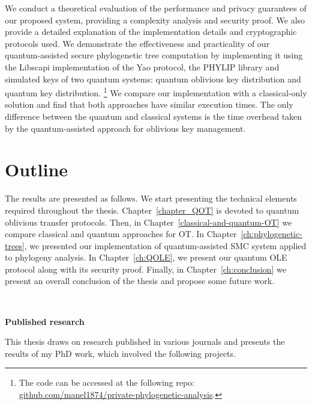 We conduct a theoretical evaluation of the performance and privacy guarantees of our proposed system, providing a complexity analysis and security proof. We also provide a detailed explanation of the implementation details and cryptographic protocols used. We demonstrate the effectiveness and practicality of our quantum-assisted secure phylogenetic tree computation by implementing it using the Libscapi implementation of the Yao protocol, the PHYLIP library and simulated keys of two quantum systems: quantum oblivious key distribution and quantum key distribution. \footnote{ The code can be accessed at the following repo: \href{https://github.com/manel1874/private-phylogenetic-analysis}{github.com/manel1874/private-phylogenetic-analysis}.} We compare our implementation with a classical-only solution and find that both approaches have similar execution times. The only difference between the quantum and classical systems is the time overhead taken by the quantum-assisted approach for oblivious key management.

\section*{Outline}

The results are presented as follows. We start presenting the technical elements required throughout the thesis. Chapter~\ref{chapter_QOT} is devoted to quantum oblivious transfer protocols. Then, in Chapter~\ref{classical-and-quantum-OT} we compare classical and quantum approaches for OT. In Chapter~\ref{ch:phylogenetic-trees}, we presented our implementation of quantum-assisted SMC system applied to phylogeny analysis. In Chapter~\ref{ch:QOLE}, we present our quantum OLE protocol along with its security proof. Finally, in Chapter~\ref{ch:conclusion} we present an overall conclusion of the thesis and propose some future work.


\

\noindent\textbf{Published research}

\noindent This thesis draws on research published in various journals and presents the results of my PhD work, which involved the following projects.

